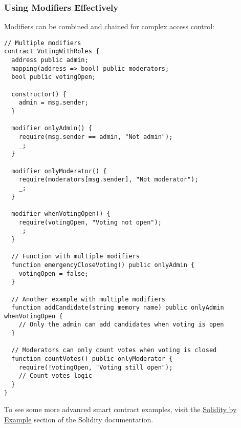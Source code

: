 \documentclass[12pt]{article}
\begin{document}
\noindent
\begin{minipage}[c]{\textwidth}
\subsubsection*{Using Modifiers Effectively}

Modifiers can be combined and chained for complex access control:

\begin{lstlisting}[language=Solidity]
// Multiple modifiers
contract VotingWithRoles {
  address public admin;
  mapping(address => bool) public moderators;
  bool public votingOpen;
  
  constructor() {
    admin = msg.sender;
  }

  modifier onlyAdmin() {
    require(msg.sender == admin, "Not admin");
    _;
  }

  modifier onlyModerator() {
    require(moderators[msg.sender], "Not moderator");
    _;
  }

  modifier whenVotingOpen() {
    require(votingOpen, "Voting not open");
    _;
  }

  // Function with multiple modifiers
  function emergencyCloseVoting() public onlyAdmin {
    votingOpen = false;
  }

  // Another example with multiple modifiers
  function addCandidate(string memory name) public onlyAdmin whenVotingOpen {
    // Only the admin can add candidates when voting is open
  }

  // Moderators can only count votes when voting is closed
  function countVotes() public onlyModerator {
    require(!votingOpen, "Voting still open");
    // Count votes logic
  }
}
\end{lstlisting}
\end{minipage}

\noindent
To see some more advanced smart contract examples, visit the \href{https://docs.soliditylang.org/en/latest/solidity-by-example.html}{Solidity by Example} section of the Solidity documentation.
\end{document}
